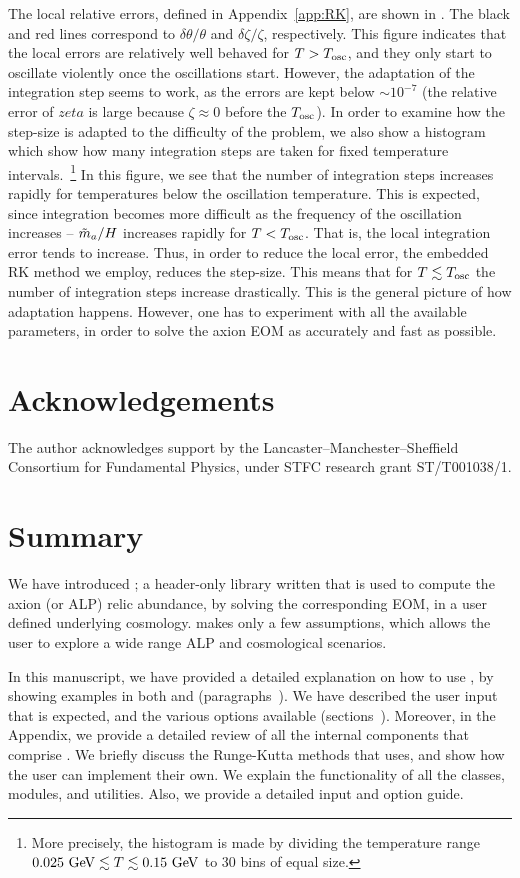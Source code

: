 \documentclass[11pt,a4paper]{article}
\begin{document}
%
The local relative errors, defined in Appendix~\ref{app:RK}, are shown in . The black and red lines correspond to $\delta \theta/\theta$ and $\delta \zeta/\zeta$, respectively. This figure indicates that the local errors are relatively well behaved for $T>T_{\rm osc}{}$, and they only start to oscillate violently once the oscillations start. However, the adaptation of the integration step seems to work, as the errors are kept below $\sim 10^{-7}$ (the relative error of $zeta$ is large because $\zeta \approx 0$ before the $T_{\rm osc}{}$).  In order to examine how the step-size is adapted to the difficulty of the problem, we also show a histogram which show how many integration steps are taken for fixed temperature intervals.~\footnote{More precisely, the histogram is made by dividing the temperature range $0.025~{\rm GeV}\lesssim T\lesssim 0.15~{\rm GeV}$ to $30$ bins of equal size.} 
%
In this figure, we see that the number of integration steps increases rapidly for temperatures below the oscillation temperature. 
%
This is expected, since integration becomes more difficult as the frequency of the oscillation increases -- $\tilde m_{a}{}/H$ increases rapidly for $T<T_{\rm osc}{}$. That is, the local integration error tends to increase. Thus, in order to reduce the local error, the embedded RK method we employ, reduces the step-size. This means that for $T \lesssim T_{\rm osc}{}$ the number of integration steps increase drastically.
%
This is the general picture of how adaptation happens. However, one has to experiment with all the available parameters, in order to solve the axion EOM as accurately and fast as possible.  

\section{Acknowledgements}
%
The author acknowledges support by the Lancaster–Manchester–Sheffield Consortium for Fundamental Physics, under STFC research grant ST/T001038/1.


\section{Summary}
%
We have introduced \mimes; a header-only library written \CPP that is used to compute the axion (or ALP) relic abundance, by solving the corresponding EOM, in a user defined underlying cosmology. \mimes makes only a few assumptions, which allows the user to explore a wide range ALP and cosmological scenarios. 

In this manuscript, we have provided a detailed explanation on how to use \mimes, by showing examples in both \CPP and \PY (paragraphs~). We have described the user input that is expected, and the various options available (sections~). Moreover, in the Appendix, we provide a detailed review of all the internal components that comprise \mimes. We briefly discuss the Runge-Kutta methods that \mimes uses, and show how the user can implement their own. We explain the functionality of all the classes, modules, and utilities. Also, we provide a detailed input and option guide.
\end{document}
